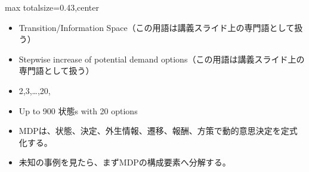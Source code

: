 \clearpage
{}
\begin{minipage}[t]{0.405\textwidth}
\begin{adjustbox}{max totalsize={\textwidth}{0.43\textheight},center}
\begin{minipage}{\textwidth}\scriptsize
{}\begin{itemize}
\item Transition/Information Space（この用語は講義スライド上の専門語として扱う）
\item Stepwise increase of potential demand options（この用語は講義スライド上の専門語として扱う）
\item 2,3,…,20,
\item Up to 900 状態s with 20 options
\end{itemize}\begin{itemize}
\item MDPは、状態、決定、外生情報、遷移、報酬、方策で動的意思決定を定式化する。
\item 未知の事例を見たら、まずMDPの構成要素へ分解する。
\end{itemize}
\end{minipage}
\end{adjustbox}
\end{minipage}\hfill
